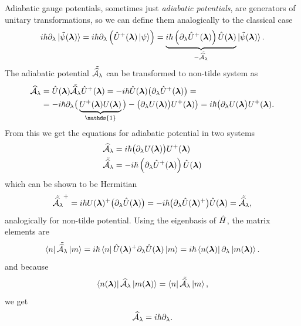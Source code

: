 Adiabatic gauge potentials, sometimes just \emph{adiabatic potentials}, are generators of unitary transformations, so we can define them analogically to the classical case
\begin{equation}
    i\hbar\partial_\lambda \ket{\tilde{\psi}(\llambda)} = i\hbar \partial_\lambda\left(\U^+(\llambda)\ket{\psi} \right)= \underbrace{i\hbar\left(\partial_\lambda \U^+(\llambda)\right)\U(\llambda)}_{-\tilde{\AA_\lambda}}\ket{\tilde{\psi}(\llambda)}.
\end{equation}
The adiabatic potential $\tilde{\AA_\lambda}$ can be transformed to non-tilde system as
\begin{equation}
    \begin{split}
        \AA_\lambda&=\U(\llambda)\tilde{\AA_\lambda}\U^+(\llambda) = -i\hbar\U(\llambda)\big(\partial_\lambda \U^+(\llambda)\big) =\\
        &= -i\hbar\partial_\lambda\big(\underbrace{U^+(\llambda)U(\llambda)}_{\mathds{1}}\big)-\big(\partial_\lambda U(\llambda)\big)U^+(\llambda) \big) =i\hbar \big(\partial_\lambda U(\llambda\big)U^+(\llambda).
    \end{split}
\end{equation}
From this we get the equations for adiabatic potential in two systems
\begin{align}
    \AA_\lambda&=i\hbar \big(\partial_\lambda U(\llambda)\big)U^+(\llambda)
    \label{eq:adiabaticPotential}\\
    \tilde{\AA_\lambda} &= -i\hbar\left(\partial_\lambda \U^+(\llambda)\right)\U(\llambda)
    \label{eq:adiabaticPotentialTilde}
\end{align}
which can be shown to be Hermitian
\begin{equation}
     \tilde{\AA_\lambda}^+=i\hbar U(\llambda)^+\big(\partial_\lambda\U(\llambda)\big)=-i\hbar\big(\partial_\lambda\U(\llambda)^+\big)\U(\llambda) = \tilde{\AA_\lambda},
     \label{eq:counterdiabaticPotentialTwoSystems}
\end{equation}
analogically for non-tilde potential.
Using the eigenbasis of $\HH$, the matrix elements are
\begin{equation}
    \bra{n}\tilde{\AA_\lambda}\ket{m}=i\hbar\bra{n}\U(\llambda)^+\partial_\lambda\U(\llambda)\ket{m} = i\hbar\bra{n(\llambda)}\partial_\lambda\ket{m(\llambda)}.
\end{equation}
and because
\begin{equation}
    \bra{n(\llambda)}\AA_\lambda\ket{ m(\llambda)}= \bra{n}\tilde{\AA_\lambda}\ket{m},
\end{equation}
we get
\begin{equation}
    \AA_\lambda = i\hbar\partial_\lambda.
    \label{eq:adiabaticPotentialDefinition}
\end{equation}



